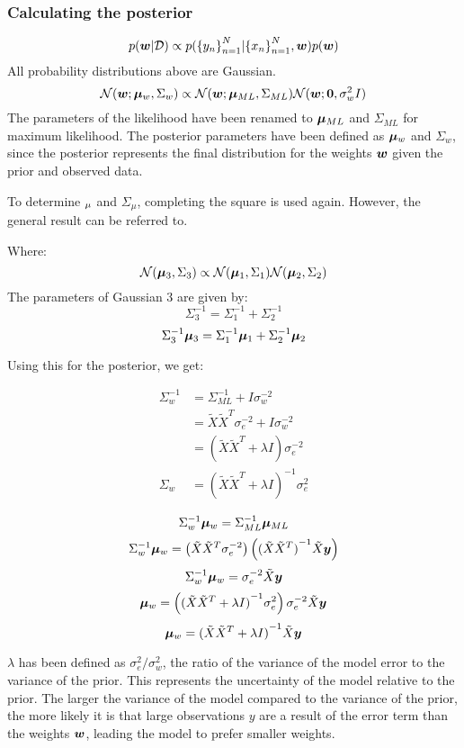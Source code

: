 \documentclass[../../main.tex]{subfiles}
\begin{document}
\subsubsection{Calculating the posterior}

\[
p(\bm{w} | \mathcal{D}) \propto
    p({\{y_n\}}_{n=1}^N | {\{x_n\}}_{n=1}^N, \bm{w})
    p(\bm{w})
\]
All probability distributions above are Gaussian.
\[
\mathcal{N}(\bm{w};\bm{\mu}_w, \Sigma_w)
\propto
\mathcal{N}(\bm{w};\bm{\mu}_{ML}, \Sigma_{ML})
\mathcal{N}(\bm{w};\bm{0}, \sigma_w^2I)
\]
The parameters of the likelihood have been renamed to $\bm{\mu}_{ML}$ and $\Sigma_{ML}$ for maximum likelihood.
The posterior parameters have been defined as $\bm{\mu}_w$ and $\Sigma_w$, since the posterior represents the final distribution for the weights $\bm{w}$ given the prior and observed data.

To determine $\bm{_}{\mu}$ and $\Sigma_{\mu}$, completing the square is used again.
However, the general result can be referred to.

Where:
\[ \mathcal{N}(\bm{\mu}_3, \Sigma_3) \propto \mathcal{N}(\bm{\mu}_1, \Sigma_1)\mathcal{N}(\bm{\mu}_2, \Sigma_2) \]
The parameters of Gaussian 3 are given by:
\[ \Sigma_3^{-1} = \Sigma_1^{-1} + \Sigma_2^{-1} \]
\[ \Sigma_3^{-1}\bm{\mu}_3 = \Sigma_1^{-1}\bm{\mu}_1 + \Sigma_2^{-1}\bm{\mu}_2 \]

Using this for the posterior, we get:

\begin{align*}
    \Sigma_w^{-1} &= \Sigma_{ML}^{-1} + I\sigma_w^{-2} \\
    &= \tilde{X}\tilde{X}^T\sigma_e^{-2} + I\sigma_w^{-2} \\
    &= (\tilde{X}\tilde{X}^T + \lambda I)\sigma_e^{-2} \\
    \Sigma_w &= {(\tilde{X}\tilde{X}^T + \lambda I)}^{-1}\sigma_e^2
\end{align*}

\[ \Sigma_w^{-1}\bm{\mu}_w = \Sigma_{ML}^{-1}\bm{\mu}_{ML} \]
\[ \Sigma_w^{-1} \bm{\mu}_w =
\left( \tilde{X}\tilde{X}^T\sigma_e^{-2} \right)
\left( {(\tilde{X}\tilde{X}^T)}^{-1}\tilde{X}\bm{y} \right) \]
\[ \Sigma_w^{-1} \bm{\mu}_w =
\sigma_e^{-2}\tilde{X}\bm{y}
\]
\[ \bm{\mu}_w =
\left( {(\tilde{X}\tilde{X}^T + \lambda I)}^{-1}\sigma_e^2 \right)
\sigma_e^{-2}\tilde{X}\bm{y}
\]
\[ \bm{\mu}_w =
{(\tilde{X}\tilde{X}^T + \lambda I)}^{-1}\tilde{X}\bm{y}
\]

$\lambda$ has been defined as $\sigma_e^2 / \sigma_w^2$, the ratio of the variance of the model error to the variance of the prior.
This represents the uncertainty of the model relative to the prior.
The larger the variance of the model compared to the variance of the prior, the more likely it is that large observations $y$ are a result of the error term than the weights $\bm{w}$, leading the model to prefer smaller weights.
\end{document}
